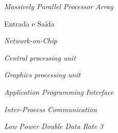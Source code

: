 
\begin{siglas}
    \item[\mppa] \textit{Massively Parallel Processor Array}
    \item[\io] Entrada e Saída
    \item[\noc] \textit{Network-on-Chip}
    \item[\cpu] \textit{Central processing unit}
    \item[\gpu] \textit{Graphics processing unit}
    \item[\api] \textit{Application Programming Interface}
    \item[\ipc] \textit{Inter-Process Communication}
    \item[\lpddr] \textit{Low Power Double Data Rate 3}
\end{siglas}

